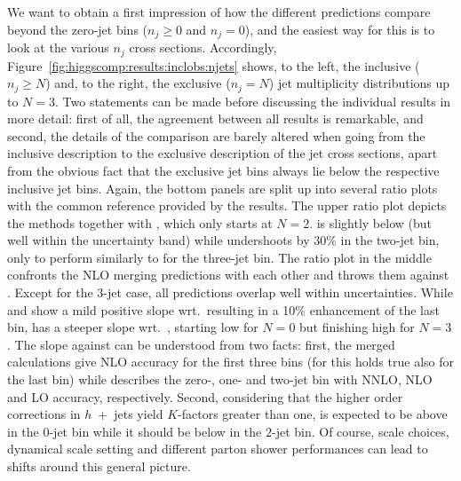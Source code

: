 We want to obtain a first impression of how the different predictions
compare beyond the zero-jet bins ($n_j\ge0$ and $n_j=0$), and the
easiest way for this is to look at the various $n_j$ cross sections.
Accordingly, Figure~\ref{fig:higgscomp:results:inclobs:njets} shows,
to the left, the inclusive ($n_j\ge N$) and, to the right, the
exclusive ($n_j=N$) jet multiplicity distributions up to $N=3$. Two
statements can be made before discussing the individual results in
more detail: first of all, the agreement between all results is
remarkable, and second, the details of the comparison are barely
altered when going from the inclusive description to the exclusive
description of the jet cross sections, apart from the obvious fact
that the exclusive jet bins always lie below the respective inclusive
jet bins. Again, the bottom panels are split up into several ratio
plots with the common reference provided by the \Powheg \NNLOPS
results. The upper ratio plot depicts the \NNLOPS methods together
with \Hej, which only starts at $N=2$. \Sherpa is slightly below
\Powheg (but well within the uncertainty band) while \Hej undershoots
by 30\% in the two-jet bin, only to perform similarly to \NNLOPS for
the three-jet bin. The ratio plot in the middle confronts the NLO
merging predictions with each other and throws them against \Powheg.
Except for the $3$-jet case, all predictions overlap well within
uncertainties.  While \Herwig and \Sherpa show a mild positive slope
wrt.~\Powheg resulting in a 10\% enhancement of the last bin, \MGaMC
has a steeper slope wrt.~\Powheg, starting low for $N=0$ but finishing
high for $N=3$. The slope against \Powheg can be understood from two
facts: first, the merged calculations give NLO accuracy for the first
three bins (for \Sherpa this holds true also for the last bin) while
\Powheg describes the zero-, one- and two-jet bin with NNLO, NLO
and LO accuracy, respectively. Second, considering that the higher
order corrections in $h$~+~jets yield $K$-factors greater than one,
\Powheg is expected to be above in the $0$-jet bin while it should be
below in the $2$-jet bin. Of course, scale choices, dynamical scale
setting and different parton shower performances can lead to shifts
around this general picture.

